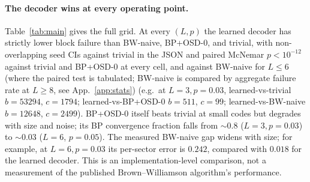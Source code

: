 \documentclass[11pt,a4paper]{article}
\begin{document}
\paragraph{The decoder wins at every operating point.} Table~\ref{tab:main}
gives the full grid. At every $(L,p)$ the learned decoder has strictly
lower block failure than BW-naive, BP+OSD-0, and trivial, with non-overlapping
seed CIs against trivial in the JSON and paired McNemar $p < 10^{-12}$ against trivial and
BP+OSD-0 at every cell, and against BW-naive for $L\le 6$ (where the paired test is
tabulated; BW-naive is compared by aggregate failure rate at $L\ge 8$, see App.~\ref{app:stats})
(e.g.\ at $L=3,p=0.03$, learned-vs-trivial $b{=}53294$,
$c{=}1794$; learned-vs-BP+OSD-0 $b{=}511$, $c{=}99$; learned-vs-BW-naive
$b{=}12648$, $c{=}2499$). BP+OSD-0 itself beats
trivial at small codes but degrades with size and noise; its BP
convergence fraction falls from $\sim 0.8$ ($L=3,p=0.03$) to $\sim 0.03$
($L=6$, $p=0.05$). The measured BW-naive gap widens with size; for example, at
$L=6,p=0.03$ its per-sector error is $0.242$, compared with $0.018$ for
the learned decoder. This is an implementation-level comparison, not a
measurement of the published Brown--Williamson algorithm's performance.
\end{document}
